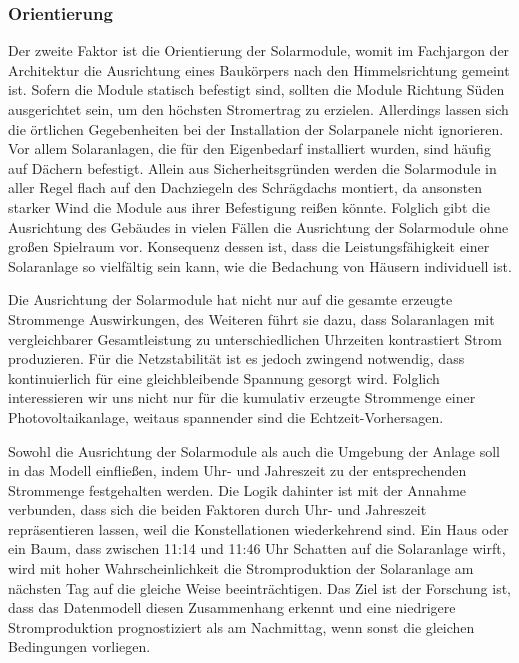 \documentclass[12pt, a4paper]{article}
\begin{document}
\subsubsection{Orientierung}

Der zweite Faktor ist die Orientierung der Solarmodule, womit im Fachjargon der Architektur die Ausrichtung eines Baukörpers nach den Himmelsrichtung gemeint ist. Sofern die Module statisch befestigt sind, sollten die Module Richtung Süden ausgerichtet sein, um den höchsten Stromertrag zu erzielen. Allerdings lassen sich die örtlichen Gegebenheiten bei der Installation der Solarpanele nicht ignorieren. Vor allem Solaranlagen, die für den Eigenbedarf installiert wurden, sind häufig auf Dächern befestigt. Allein aus Sicherheitsgründen werden die Solarmodule in aller Regel flach auf den Dachziegeln des Schrägdachs montiert, da ansonsten starker Wind die Module aus ihrer Befestigung reißen könnte. Folglich gibt die Ausrichtung des Gebäudes in vielen Fällen die Ausrichtung der Solarmodule ohne großen Spielraum vor. Konsequenz dessen ist, dass die Leistungsfähigkeit einer Solaranlage so vielfältig sein kann, wie die Bedachung von Häusern individuell ist.

Die Ausrichtung der Solarmodule hat nicht nur auf die gesamte erzeugte Strommenge Auswirkungen, des Weiteren führt sie dazu, dass Solaranlagen mit vergleichbarer Gesamtleistung zu unterschiedlichen Uhrzeiten kontrastiert Strom produzieren. Für die Netzstabilität ist es jedoch zwingend notwendig, dass kontinuierlich für eine gleichbleibende Spannung gesorgt wird. Folglich interessieren wir uns nicht nur für die kumulativ erzeugte Strommenge einer Photovoltaikanlage, weitaus spannender sind die Echtzeit-Vorhersagen. 

Sowohl die Ausrichtung der Solarmodule als auch die Umgebung der Anlage soll in das Modell einfließen, indem Uhr- und Jahreszeit zu der entsprechenden Strommenge festgehalten werden. Die Logik dahinter ist mit der Annahme verbunden, dass sich die beiden Faktoren durch Uhr- und Jahreszeit repräsentieren lassen, weil die Konstellationen wiederkehrend sind. Ein Haus oder ein Baum, dass zwischen 11:14 und 11:46 Uhr Schatten auf die Solaranlage wirft, wird mit hoher Wahrscheinlichkeit die Stromproduktion der Solaranlage am nächsten Tag auf die gleiche Weise beeinträchtigen. Das Ziel ist der Forschung ist, dass das Datenmodell diesen Zusammenhang erkennt und eine niedrigere Stromproduktion prognostiziert als am Nachmittag, wenn sonst die gleichen Bedingungen vorliegen.
\end{document}
